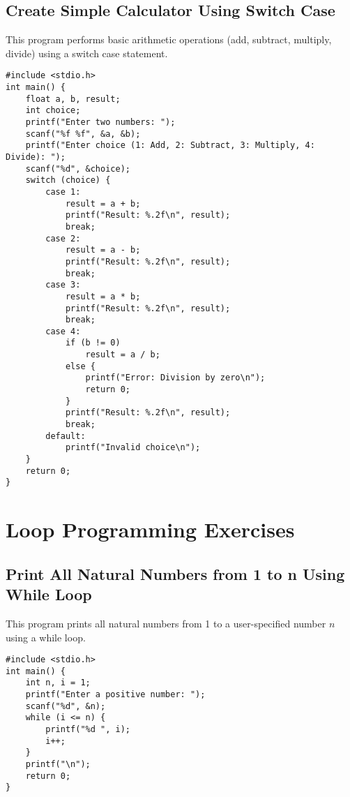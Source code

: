 \documentclass[a4paper,12pt]{article}
\begin{document}
\newpage

\subsection{Create Simple Calculator Using Switch Case}
This program performs basic arithmetic operations (add, subtract, multiply, divide) using a switch case statement.

\begin{lstlisting}[caption={Create Simple Calculator Using Switch Case}]
#include <stdio.h>
int main() {
    float a, b, result;
    int choice;
    printf("Enter two numbers: ");
    scanf("%f %f", &a, &b);
    printf("Enter choice (1: Add, 2: Subtract, 3: Multiply, 4: Divide): ");
    scanf("%d", &choice);
    switch (choice) {
        case 1:
            result = a + b;
            printf("Result: %.2f\n", result);
            break;
        case 2:
            result = a - b;
            printf("Result: %.2f\n", result);
            break;
        case 3:
            result = a * b;
            printf("Result: %.2f\n", result);
            break;
        case 4:
            if (b != 0)
                result = a / b;
            else {
                printf("Error: Division by zero\n");
                return 0;
            }
            printf("Result: %.2f\n", result);
            break;
        default:
            printf("Invalid choice\n");
    }
    return 0;
}
\end{lstlisting}

\newpage

\section{Loop Programming Exercises}

\subsection{Print All Natural Numbers from 1 to n Using While Loop}
This program prints all natural numbers from 1 to a user-specified number \(n\) using a while loop.

\begin{lstlisting}[caption={Print All Natural Numbers from 1 to n Using While Loop}]
#include <stdio.h>
int main() {
    int n, i = 1;
    printf("Enter a positive number: ");
    scanf("%d", &n);
    while (i <= n) {
        printf("%d ", i);
        i++;
    }
    printf("\n");
    return 0;
}
\end{lstlisting}
\end{document}
